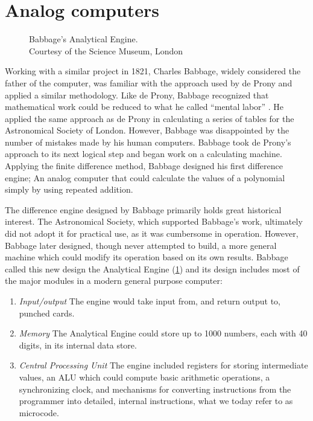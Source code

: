 \documentclass[\rootfolder/main.tex]{subfiles}
\begin{document}
\section{Analog computers}

\begin{figure}[ht]
    \caption[Babbage's Analytical Engine]
            {Babbage's Analytical Engine. \\ Courtesy of the Science Museum, London \label{fig:engine}}
\end{figure}

Working with a similar project in 1821, Charles Babbage, widely considered the father of the computer, was familiar with the approach used by de Prony and applied a similar methodology.
Like de Prony, Babbage recognized that mathematical work could be reduced to what he called ``mental labor'' \cite{babbage1832}.
He applied the same approach as de Prony in calculating a series of tables for the Astronomical Society of London.
However, Babbage was disappointed by the number of mistakes made by his human computers.
Babbage took de Prony's approach to its next logical step and began work on a calculating machine.
Applying the finite difference method, Babbage designed his first difference engine; An analog computer that could calculate the values of a polynomial simply by using repeated addition.

The difference engine designed by Babbage primarily holds great historical interest.
The Astronomical Society, which supported Babbage's work, ultimately did not adopt it for practical use, as it was cumbersome in operation.
However, Babbage later designed, though never attempted to build, a more general machine which could modify its operation based on its own results.
Babbage called this new design the Analytical Engine (\cref{fig:engine}) and its design includes most of the major modules in a modern general purpose computer:

\begin{enumerate}
  \item \textit{Input/output} The engine would take input from, and return output to, punched cards.
  \item \textit{Memory} The Analytical Engine could store up to 1000 numbers, each with 40 digits, in its internal data store.
  \item \textit{Central Processing Unit} The engine included registers for storing intermediate values, an ALU which could compute basic arithmetic operations, a synchronizing clock,
      and mechanisms for converting instructions from the programmer into detailed, internal instructions, what we today refer to as microcode.
\end{enumerate}
\end{document}
